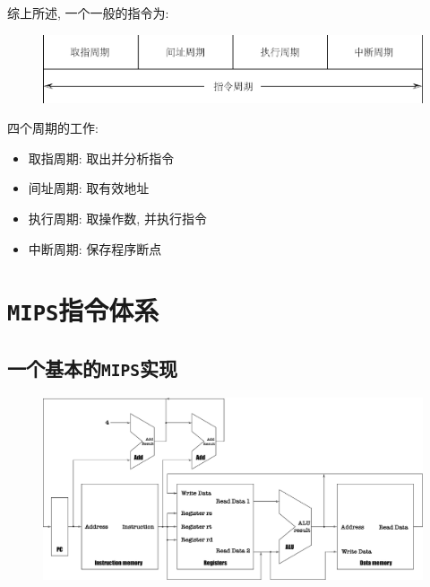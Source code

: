 综上所述, 一个一般的指令为:
\begin{figure}[H]
\centering
\includegraphics[scale=.6]{img/figure23.pdf}
\end{figure}
四个周期的工作:
\begin{itemize}
\item 取指周期: 取出并分析指令
\item 间址周期: 取有效地址
\item 执行周期: 取操作数, 并执行指令
\item 中断周期: 保存程序断点
\end{itemize}
\section{\texttt{MIPS}指令体系}
\subsection{一个基本的\texttt{MIPS}实现}
\begin{figure}[H]
\centering
\includegraphics[scale=.3]{img/figure24.pdf}
\end{figure}
